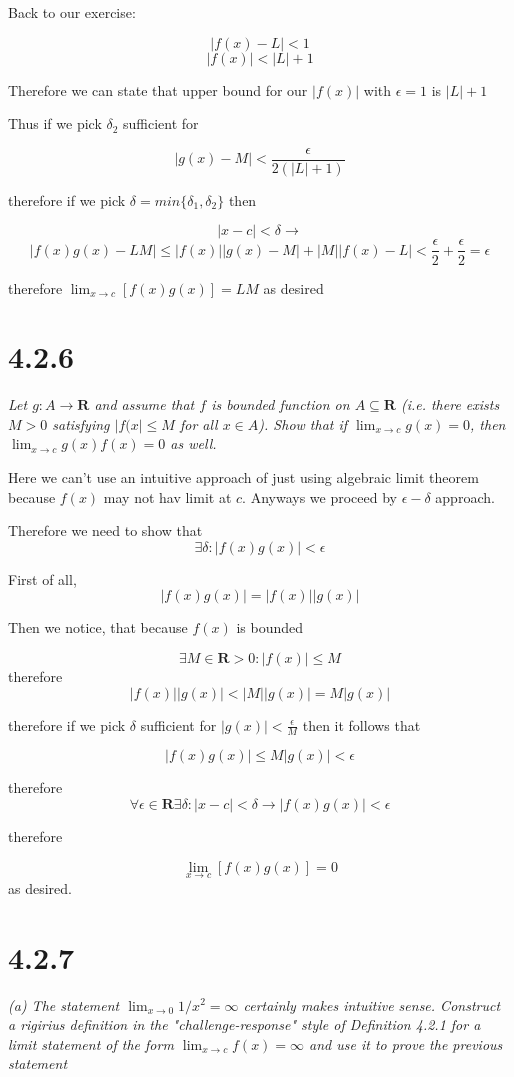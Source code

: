 \documentclass[11pt,oneside,titlepage]{article}
\begin{document}
Back to our exercise: 

$$|f(x) - L| < 1$$
$$|f(x)| < |L| + 1$$

Therefore we can state that upper bound for our $|f(x)|$ with $\epsilon = 1$ is $|L| + 1$

Thus if we pick $\delta_2$ sufficient for

$$|g(x) - M| < \frac{\epsilon}{2(|L| + 1)}$$

therefore if we pick $\delta = min\{\delta_1, \delta_2\}$ then

$$|x - c| < \delta \to $$
$$|f(x)g(x) - LM| \leq |f(x)||g(x) - M| + |M||f(x) - L| <  \frac{\epsilon}{2} +
\frac{\epsilon}{2} = \epsilon  $$

therefore $\lim_{x \to c}[f(x) g(x)] = LM$ as desired

\section*{4.2.6}
\textit{Let $g: A\to \textbf{R}$ and assume that $f$ is bounded function on $A \subseteq \textbf{R}$
  (i.e. there exists $M > 0$ satisfying $|f(x| \leq M$ for all $x \in A$). Show that
  if $\lim_{x \to c}g(x) = 0$, then $\lim_{x \to c}g(x)f(x) = 0$ as well.}

Here we can't use an intuitive approach of just using algebraic limit theorem because $f(x)$ may
not hav limit at $c$.
Anyways we proceed by $\epsilon-\delta$ approach.

Therefore we need to show that
$$\exists \delta: |f(x)g(x)| < \epsilon$$

First of all,
$$ |f(x)g(x)| = |f(x)||g(x)|$$

Then we notice, that because $f(x)$ is bounded

$$\exists M \in \textbf{R} > 0: |f(x)| \leq M$$
therefore
$$|f(x)||g(x)| < |M||g(x)| = M|g(x)|$$

therefore if we pick $\delta$ sufficient for $|g(x)| < \frac{\epsilon}{M}$ then it follows that

$$|f(x)g(x)| \leq M|g(x)| < \epsilon$$

therefore
$$\forall \epsilon \in \textbf{R} \exists \delta : |x - c| < \delta \to |f(x)g(x)| < \epsilon$$

therefore

$$\lim_{x \to c}[f(x)g(x)] = 0$$
as desired.

\section*{4.2.7}
\textit{(a) The statement $\lim_{x \to 0}1/x^2 = \infty$ certainly makes intuitive sense. Construct a rigirius definition in the "challenge-response" style of Definition 4.2.1 for a limit statement of the form $\lim_{x \to c}f(x) = \infty$ and use it to prove the previous statement }
\end{document}
